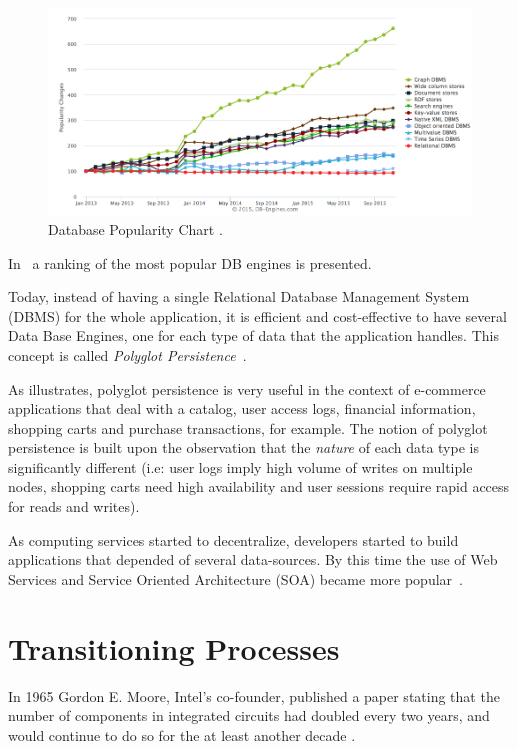 \begin{figure}[ht!]
\centering
\includegraphics[width=150mm]{popularityDB.png}
\caption{Database Popularity Chart \cite{dbrankingchart} .\label{fig:popularityDB}}
\end{figure}


In~\cite{dbranking} a ranking of the most popular DB engines is presented.

Today, instead of having a single Relational Database Management System (DBMS) for the whole application, it is efficient and cost-effective to have several Data Base Engines, one for each type of data that the application handles. 
This concept is called \textit{Polyglot Persistence}~\cite{sadalage2012nosql}.

As \cite{AdressingDataManagementCloud} illustrates, polyglot persistence is very useful in the context of  e-commerce applications that deal with a catalog, user access logs, financial information, shopping carts and purchase transactions, for example.
The notion of polyglot persistence is built upon the observation that the \textit{nature} of each data type is significantly different (i.e: user logs imply high volume of writes on multiple nodes, shopping carts need high availability and user sessions require rapid access for reads and writes). 

As computing services started to decentralize, developers started to build applications that depended of several data-sources. 
By this time the use of Web Services and Service Oriented Architecture (SOA) became more popular~\cite{Armbrust09m.:above}. 



\section{Transitioning Processes}

In 1965 Gordon E. Moore, Intel's co-founder, published a paper stating that the number of components in integrated circuits had doubled every two years, and would continue to do so for the at least another decade  \cite{658762}.

